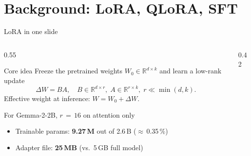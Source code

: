 \documentclass[aspectratio=169, 10pt]{beamer}
\begin{document}
\section{Background: LoRA, QLoRA, SFT}

\begin{frame}{LoRA in one slide}
  \begin{columns}[T]
    \begin{column}{0.55\textwidth}
      \begin{block}{Core idea}
        \scriptsize
        Freeze the pretrained weights $W_0 \in \mathbb{R}^{d\times k}$
        and learn a low-rank update
        \[
          \Delta W = B A,\quad
          B\!\in\!\mathbb{R}^{d\times r},\;
          A\!\in\!\mathbb{R}^{r\times k},\;
          r \ll \min(d,k).
        \]
        Effective weight at inference: $W = W_0 + \Delta W$.
      \end{block}
      \begin{exampleblock}{For Gemma-2-2B, $r\,=\,16$ on attention only}
        \scriptsize
        \begin{itemize}
          \item Trainable params: \textbf{9.27\,M} out of 2.6\,B
                ($\approx$\,0.35\,\%)
          \item Adapter file: \textbf{25\,MB} (vs.\ 5\,GB full model)
        \end{itemize}
      \end{exampleblock}
    \end{column}
    \begin{column}{0.42\textwidth}
      \begin{center}
\end{center}
\end{column}
\end{columns}
\end{frame}
\end{document}
